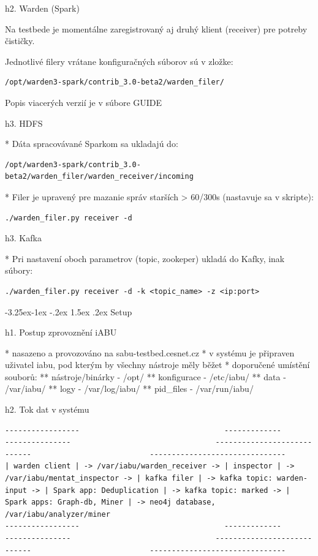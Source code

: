 \documentclass[a4paper]{article} %
\makeatletter
\renewcommand\subsection{\@startsection{subsection}{2}{\z@}%
                   {-3.25ex\@plus -1ex \@minus -.2ex}%
                   {1.5ex \@plus .2ex}%
                   {\normalfont\sffamily\large\bfseries\color{projectcolor}}}
\makeatother
\begin{document}
h2. Warden (Spark)

Na testbede je momentálne zaregistrovaný aj druhý klient (receiver) pre potreby čističky.

Jednotlivé filery vrátane konfiguračných súborov sú v zložke:
\begin{lstlisting}[]/opt/warden3-spark/contrib_3.0-beta2/warden_filer/\end{lstlisting}

Popis viacerých verzií je v súbore GUIDE

h3. HDFS

* Dáta spracovávané Sparkom sa ukladajú do:
\begin{lstlisting}[]/opt/warden3-spark/contrib_3.0-beta2/warden_filer/warden_receiver/incoming\end{lstlisting}

* Filer je upravený pre mazanie správ starších > 60/300s (nastavuje sa v skripte):
\begin{lstlisting}[]./warden_filer.py receiver -d\end{lstlisting}


h3. Kafka

* Pri nastavení oboch parametrov (topic, zookeper) ukladá do Kafky, inak súbory:
\begin{lstlisting}[]./warden_filer.py receiver -d -k <topic_name> -z <ip:port>\end{lstlisting}

\subsection{Setup}

h1. Postup zprovoznění iABU

* nasazeno a provozováno na sabu-testbed.cesnet.cz
* v systému je připraven uživatel iabu, pod kterým by všechny nástroje měly běžet
* doporučené umístění souborů:
** nástroje/binárky - /opt/
** konfigurace - /etc/iabu/
** data - /var/iabu/
** logy - /var/log/iabu/
** pid\_files - /var/run/iabu/

h2. Tok dat v systému

\begin{lstlisting}[]
-----------------                                 -------------                                  ---------------                                 ----------------------------                           -------------------------------
| warden client | -> /var/iabu/warden_receiver -> | inspector | -> /var/iabu/mentat_inspector -> | kafka filer | -> kafka topic: warden-input -> | Spark app: Deduplication | -> kafka topic: marked -> | Spark apps: Graph-db, Miner | -> neo4j database, /var/iabu/analyzer/miner
-----------------                                 -------------                                  ---------------                                 ----------------------------                           -------------------------------
\end{lstlisting}
\end{document}
